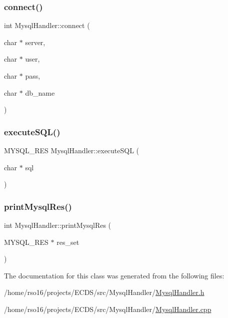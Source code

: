 \subsubsection{\texorpdfstring{connect()}{connect()}}
{\footnotesize\ttfamily int Mysql\+Handler\+::connect (\begin{DoxyParamCaption}\item[{char $\ast$}]{server,  }\item[{char $\ast$}]{user,  }\item[{char $\ast$}]{pass,  }\item[{char $\ast$}]{db\+\_\+name }\end{DoxyParamCaption})}

\mbox{\label{classMysqlHandler_abee4d47196df8c42420fe771508a6ff9}} 
\subsubsection{\texorpdfstring{execute\+S\+Q\+L()}{executeSQL()}}
{\footnotesize\ttfamily M\+Y\+S\+Q\+L\+\_\+\+R\+ES Mysql\+Handler\+::execute\+S\+QL (\begin{DoxyParamCaption}\item[{char $\ast$}]{sql }\end{DoxyParamCaption})}

\mbox{\label{classMysqlHandler_affb80fba704894dca83d563f6582edc0}} 
\subsubsection{\texorpdfstring{print\+Mysql\+Res()}{printMysqlRes()}}
{\footnotesize\ttfamily int Mysql\+Handler\+::print\+Mysql\+Res (\begin{DoxyParamCaption}\item[{M\+Y\+S\+Q\+L\+\_\+\+R\+ES $\ast$}]{res\+\_\+set }\end{DoxyParamCaption})}



The documentation for this class was generated from the following files\+:\begin{DoxyCompactItemize}
\item 
/home/rso16/projects/\+E\+C\+D\+S/src/\+Mysql\+Handler/\hyperlink{MysqlHandler_8h}{Mysql\+Handler.\+h}\item 
/home/rso16/projects/\+E\+C\+D\+S/src/\+Mysql\+Handler/\hyperlink{MysqlHandler_8cpp}{Mysql\+Handler.\+cpp}\end{DoxyCompactItemize}
